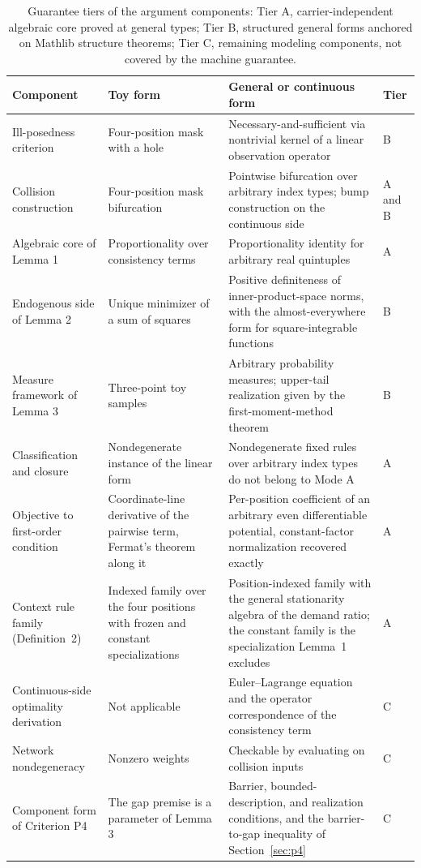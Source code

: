 \begin{table}[t]
\caption{Guarantee tiers of the argument components: Tier A, carrier-independent algebraic core proved at general types; Tier B, structured general forms anchored on Mathlib structure theorems; Tier C, remaining modeling components, not covered by the machine guarantee.}
\label{tab:layers}
\centering
\small
\begin{tabular}{@{}>{\raggedright\arraybackslash}p{}>{\raggedright\arraybackslash}p{}>{\raggedright\arraybackslash}p{}>{\centering\arraybackslash}p{}@{}}
\hline
\textbf{Component} & \textbf{Toy form} & \textbf{General or continuous form} & \textbf{Tier}\\
\hline
Ill-posedness criterion & Four-position mask with a hole & Necessary-and-sufficient via nontrivial kernel of a linear observation operator & B\\
\hline
Collision construction & Four-position mask bifurcation & Pointwise bifurcation over arbitrary index types; bump construction on the continuous side & A and B\\
\hline
Algebraic core of Lemma 1 & Proportionality over consistency terms & Proportionality identity for arbitrary real quintuples & A\\
\hline
Endogenous side of Lemma 2 & Unique minimizer of a sum of squares & Positive definiteness of inner-product-space norms, with the almost-everywhere form for square-integrable functions & B\\
\hline
Measure framework of Lemma 3 & Three-point toy samples & Arbitrary probability measures; upper-tail realization given by the first-moment-method theorem & B\\
\hline
Classification and closure & Nondegenerate instance of the linear form & Nondegenerate fixed rules over arbitrary index types do not belong to Mode A & A\\
\hline
Objective to first-order condition & Coordinate-line derivative of the pairwise term, Fermat's theorem along it & Per-position coefficient of an arbitrary even differentiable potential, constant-factor normalization recovered exactly & A\\
\hline
Context rule family (Definition~2) & Indexed family over the four positions with frozen and constant specializations & Position-indexed family with the general stationarity algebra of the demand ratio; the constant family is the specialization Lemma~1 excludes & A\\
\hline
Continuous-side optimality derivation & Not applicable & Euler--Lagrange equation and the operator correspondence of the consistency term & C\\
\hline
Network nondegeneracy & Nonzero weights & Checkable by evaluating on collision inputs & C\\
\hline
Component form of Criterion P4 & The gap premise is a parameter of Lemma 3 & Barrier, bounded-description, and realization conditions, and the barrier-to-gap inequality of Section~\ref{sec:p4} & C\\
\hline
\end{tabular}
\end{table}

